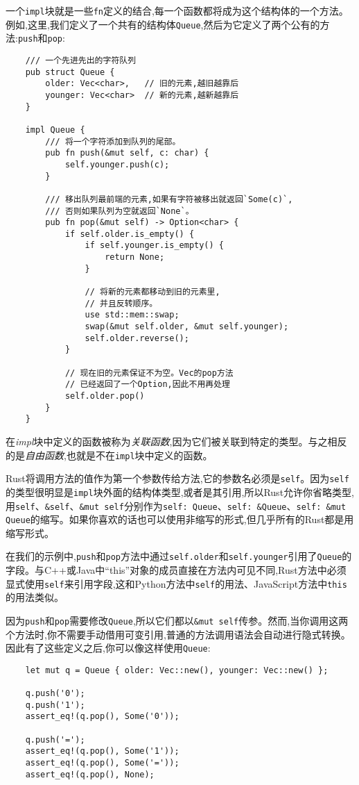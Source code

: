 一个\texttt{impl}块就是一些\texttt{fn}定义的结合,每一个函数都将成为这个结构体的一个方法。例如,这里,我们定义了一个共有的结构体\texttt{Queue},然后为它定义了两个公有的方法:\texttt{push}和\texttt{pop}:
\begin{verbatim}
    /// 一个先进先出的字符队列
    pub struct Queue {
        older: Vec<char>,   // 旧的元素,越旧越靠后
        younger: Vec<char>  // 新的元素,越新越靠后
    }

    impl Queue {
        /// 将一个字符添加到队列的尾部。
        pub fn push(&mut self, c: char) {
            self.younger.push(c);
        }

        /// 移出队列最前端的元素,如果有字符被移出就返回`Some(c)`,
        /// 否则如果队列为空就返回`None`。
        pub fn pop(&mut self) -> Option<char> {
            if self.older.is_empty() {
                if self.younger.is_empty() {
                    return None;
                }

                // 将新的元素都移动到旧的元素里,
                // 并且反转顺序。
                use std::mem::swap;
                swap(&mut self.older, &mut self.younger);
                self.older.reverse();
            }

            // 现在旧的元素保证不为空。Vec的pop方法
            // 已经返回了一个Option,因此不用再处理
            self.older.pop()
        }
    }
\end{verbatim}

在\emph{impl}块中定义的函数被称为\emph{关联函数},因为它们被关联到特定的类型。与之相反的是\emph{自由函数},也就是不在\texttt{impl}块中定义的函数。

Rust将调用方法的值作为第一个参数传给方法,它的参数名必须是\texttt{self}。因为\texttt{self}的类型很明显是\texttt{impl}块外面的结构体类型,或者是其引用,所以Rust允许你省略类型,用\texttt{self}、\texttt{\&self}、\texttt{\&mut self}分别作为\texttt{self: Queue}、\texttt{self: \&Queue}、\texttt{self: \&mut Queue}的缩写。如果你喜欢的话也可以使用非缩写的形式,但几乎所有的Rust都是用缩写形式。

在我们的示例中,\texttt{push}和\texttt{pop}方法中通过\texttt{self.older}和\texttt{self.younger}引用了\texttt{Queue}的字段。与C++或Java中“this”对象的成员直接在方法内可见不同,Rust方法中必须显式使用\texttt{self}来引用字段,这和Python方法中\texttt{self}的用法、JavaScript方法中\texttt{this}的用法类似。

因为\texttt{push}和\texttt{pop}需要修改\texttt{Queue},所以它们都以\texttt{\&mut self}传参。然而,当你调用这两个方法时,你不需要手动借用可变引用,普通的方法调用语法会自动进行隐式转换。因此有了这些定义之后,你可以像这样使用\texttt{Queue}:
\begin{verbatim}
    let mut q = Queue { older: Vec::new(), younger: Vec::new() };

    q.push('0');
    q.push('1');
    assert_eq!(q.pop(), Some('0'));

    q.push('=');
    assert_eq!(q.pop(), Some('1'));
    assert_eq!(q.pop(), Some('='));
    assert_eq!(q.pop(), None);
\end{verbatim}

